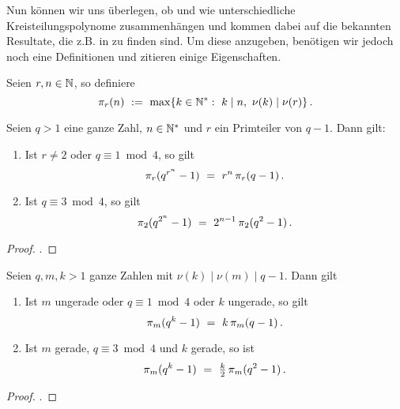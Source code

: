 Nun können wir uns überlegen, ob und wie unterschiedliche Kreisteilungspolynome
zusammenhängen und kommen dabei auf die bekannten Resultate, die z.B. in 
\autocite[Proposition 10.6, 10.7]{hachenberger1997finite} zu finden sind. Um
diese anzugeben, benötigen wir jedoch noch eine Definitionen und zitieren
einige Eigenschaften.

\begin{definition}
  Seien $r,n\in \mathbb{N}$, so definiere
  \[ \pi_r(n) \ :=\  \max\{k \in \mathbb{N}^\ast:\ k \mid n,\ \nu(k) \mid \nu(r)
  \}\,.\]
\end{definition}


\begin{lemma}
  \label{lemma:cl_1}
  Seien $q>1$ eine ganze Zahl, $n\in \mathbb{N}^\ast$ und $r$ ein Primteiler von $q-1$.
  Dann gilt:
  \begin{enumerate}
    \item Ist $r\neq 2$ oder $q\equiv 1 \bmod 4$, so gilt
      \[ \pi_r(q^{r^n}-1) \ =\  r^n\, \pi_r(q-1) \,.\]
    \item Ist $q \equiv 3 \bmod 4$, so gilt
      \[ \pi_2(q^{2^n}-1) \ =\  2^{n-1}\, \pi_2(q^2-1)\,.\]
  \end{enumerate}
\end{lemma}
\begin{proof}
  \autocite[Lemma 19.4]{hachenberger1997finite}.
\end{proof}


\begin{lemma}
  \label{lemma:cl_2}
  Seien $q,m,k > 1$ ganze Zahlen mit $\nu(k) \mid \nu(m)\mid q-1$. Dann gilt
  \begin{enumerate}
    \item Ist $m$ ungerade oder $q \equiv 1 \bmod 4$ oder $k$ ungerade, so
      gilt
      \[ \pi_m(q^k-1) \ =\  k\,\pi_m(q-1)\,. \]
    \item Ist $m$ gerade, $q \equiv 3 \bmod 4$ und $k$ gerade, so ist
      \[ \pi_m(q^k-1) \ =\  \tfrac k 2\, \pi_m(q^2-1)\,.\]
  \end{enumerate}
\end{lemma}
\begin{proof}
  \autocite[Lemma 19.5]{hachenberger1997finite}.
\end{proof}


